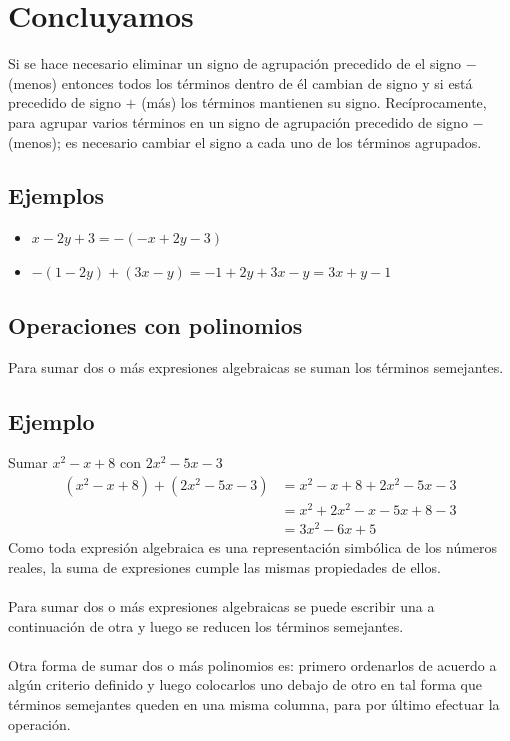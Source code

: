 \documentclass[10pt,twoside]{article}
\begin{document}
\section{Concluyamos}
Si se hace necesario eliminar un signo de agrupación precedido de el signo $-$ (menos) entonces todos los términos dentro de él cambian de signo y si está precedido de signo $+$ (más) los términos mantienen su signo. Recíprocamente, para agrupar varios términos en un signo de agrupación precedido de signo $-$ (menos); es necesario cambiar el signo a cada uno de los términos agrupados.
\subsection*{Ejemplos}
\begin{itemize}
  \item $ x-2y+3=-(-x+2y-3) $ \item $ -(1-2y)+(3x-y)=-1+2y+3x-y=3x+y-1 $ 
\end{itemize}
\subsection{Operaciones con polinomios}
Para sumar dos o más expresiones algebraicas se suman los términos semejantes.
\subsection*{Ejemplo}
Sumar $ x^2 - x + 8\text{ con }2x^2 - 5x - 3 $
\begin{align*}
(x^2 - x + 8) + (2x^2 - 5x - 3) &= x^2 - x + 8 + 2x^2 - 5x - 3\\
&= x^2 + 2x^2 - x - 5x + 8 - 3\\
&= 3x^2 - 6x + 5
\end{align*}
Como toda expresión algebraica es una representación simbólica de los
números reales, la suma de expresiones cumple las mismas propiedades de ellos.\\\\
Para sumar dos o más expresiones algebraicas se puede escribir una a
continuación de otra y luego se reducen los términos semejantes.\\\\
Otra forma de sumar dos o más polinomios es: primero ordenarlos de acuerdo a algún criterio definido y luego colocarlos uno debajo de otro en tal forma que términos semejantes queden en una misma columna, para por último efectuar la operación.
\end{document}
